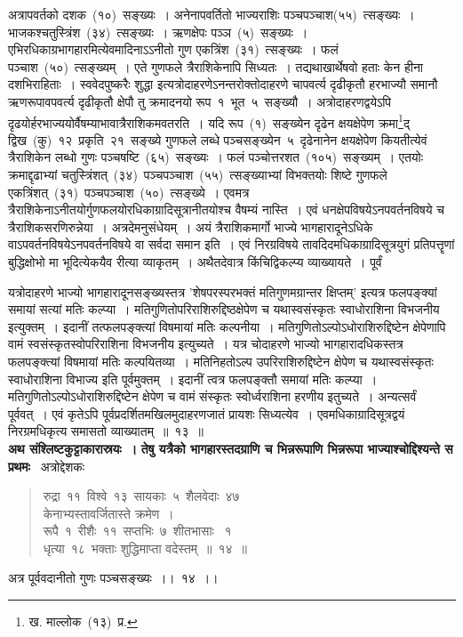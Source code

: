 \documentclass[11pt, openany]{book}
\begin{document}
\indent
अत्रापवर्तको दशक~(१०)~सङ्ख्यः~। अनेनापवर्तितो भाज्यराशिः पञ्चपञ्चाश(५५)~त्सङ्ख्यः~।भाजकश्चतुस्त्रिंश~(३४)~त्सङ्ख्यः~। ऋणक्षेपः पञ्ञ~(५)~सङ्ख्यः~। एभिरधिकाग्रभागहारमित्येवमादिनाऽऽनीतो गुण एकत्रिंश~(३१)~त्सङ्ख्यः~। फलं पञ्चाश~(५०)~त्सङ्ख्यम्~। एते गुणफले त्रैराशिकेनापि सिध्यतः~। तद्यथा\textendash खार्थेषवो हताः केन हीना दशभिराहिताः~। स्ववेदपुष्करैः शुद्धा इत्यत्रोदाहरणेऽनन्तरोक्तोदाहरणे चापवर्त्य दृढीकृतौ हरभाज्यौ समानौ ऋणरूपावपवर्त्य दृढीकृतौ क्षेपौ तु क्रमादनयो रूप~१~भूत~५~सङ्ख्यौ~। अत्रोदाहरणद्वयेऽपि दृढयोर्हरभाज्ययोर्वैषम्याभावात्रैराशिकमवतरति~। यदि रूप~(१)~सङ्ख्येन दृढेन क्षयक्षेपेण क्रमा\renewcommand\thefootnote{१}\footnote{ख. माल्लोक~(१३)~प्र.}द् द्विख~(कु)~१२~प्रकृति~२१~सङ्ख्ये गुणफले लब्धे पञ्चसङ्ख्येन~५~दृढेनानेन क्षयक्षेपेण कियतीत्येवं त्रैराशिकेन लब्धो गुणः पञ्चषष्टि~(६५)~सङ्ख्यः~। फलं पञ्चोत्तरशत~(१०५)~सङ्ख्यम्~। एतयोः क्रमाद्दृढाभ्यां चतुस्त्रिंशत्~(३४)~पञ्चपञ्चाश~(५५)~त्सङ्ख्याभ्यां विभक्तयोः शिष्टे गुणफले एकत्रिंशत्~(३१)~पञ्चपञ्चाश~(५०)~त्सङ्ख्ये~। एवमत्र त्रैराशिकेनाऽनीतयोर्गुणफलयोरधिकाग्रादिसूत्रानीतयोश्च वैषम्यं नास्ति~। एवं धनक्षेपविषयेऽनपवर्तनविषये च त्रैराशिकसरणिरुन्नेया~। अत्रदेमनुसंधेयम्~। अयं त्रैराशिकमार्गो भाज्ये भागहारादूनेऽधिके वाऽपवर्तनविषयेऽनपवर्तनविषये वा सर्वदा समान इति~। एवं निरग्रविषये तावदिदमधिकाग्रादिसूत्रयुगं प्रतिपत्तॄणां बुद्धिक्षोभो मा भूदित्येकयैव रीत्या व्याकृतम्~। अथैतदेवात्र किंचिद्विकल्प्य व्याख्यायते~। पूर्वं


\newpage
\thispagestyle{fancy}
\fancyhf{}

\noindent
यत्रोदाहरणे भाज्यो भागहारादूनसङ्ख्यस्तत्र 'शेषपरस्परभक्तं मतिगुणमग्रान्तर क्षिप्तम्' इत्यत्र फलपङ्क्यां समायां सत्यां मतिः कल्प्या~। मतिगुणितोपरिराशिरुद्दिष्ठक्षेपेण च यथास्वसंस्कृतः स्वाधोराशिना विभजनीय इत्युक्तम्~। इदानीं तत्फलपङ्क्त्यां विषमायां मतिः कल्पनीया~। मतिगुणितोऽल्पोऽधोराशिरुद्दिष्टेन
क्षेपेणापि वामं स्वसंस्कृतस्वोपरिराशिना विभजनीय इत्युच्यते~। यत्र चोदाहरणे भाज्यो भागहारादधिकस्तत्र फलपङ्क्त्यां विषमायां मतिः कल्पयितव्या~। मतिनिहतोऽल्प उपरिराशिरुद्दिष्टेन क्षेपेण च यथास्वसंस्कृतः स्वाधोराशिना विभाज्य इति पूर्वमुक्तम्~। इदानीं त्वत्र फलपङ्क्तौ समायां मतिः कल्प्या~।
मतिगुणितोऽल्पोऽधोराशिरुद्दिष्टेन क्षेपेण च वामं संस्कृतः स्वोर्ध्वराशिना हरणीय इतुच्यते~। अन्यत्सर्वं पूर्ववत्~। एवं कृतेऽपि पूर्वप्रदर्शितमखिलमुदाहरणजातं प्रायशः सिध्यत्येव~। एवमधिकाग्रादिसूत्रद्वयं निरग्रमधिकृत्य समासतो व्याख्यातम्~॥~१३~॥\\

\indent
\textbf{अथ संश्लिष्टकुट्टाकारास्रयः~।} 
\textbf{तेषु यत्रैको भागहारस्तदग्राणि च भिन्नरूपाणि भिन्नरूपा भाज्याश्चोद्दिश्यन्ते स प्रथमः }\textendash\ अत्रोद्देशकः\textendash\begin{quote}
{\ku रुद्रा~११~विश्वे~१३~सायकाः~५~शैलवेदाः~४७\\
केनाभ्यस्तावर्जितास्ते क्रमेण~।\\
रूपै~१~रीशैः~११~सप्तभिः~७~शीतभासाः ~१\\
धृत्या~१८~भक्ताः शुद्धिमाप्ता वदेस्तम्~॥~१४~॥}
\end{quote}
\indent
अत्र पूर्ववदानीतो गुणः पञ्चसङ्ख्यः~।।~१४~।।\\
\end{document}
